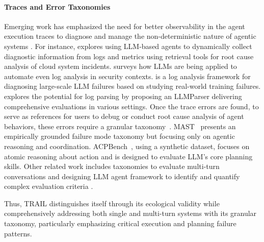\paragraph{Traces and Error Taxonomies} Emerging work has emphasized the need for better observability in the agent execution traces to diagnose and manage the non-deterministic nature of agentic systems \cite{kapoor2024ai, zhuge2024agent, moshkovich2025beyond, cemri2025multi}. 
For instance, \citet{roy2024exploring} explores using LLM-based agents to dynamically collect diagnostic information from logs and metrics using retrieval tools for root cause analysis of cloud system incidents. \citet{akhtar2025llm} surveys how LLMs are being applied to automate even log analysis in security contexts. \citet{jiang2025l4} is a log analysis framework for diagnosing large-scale LLM failures based on studying real-world training failures. \citet{Ma2024LLMParserAE} explores the potential for log parsing by proposing an LLMParser delivering comprehensive evaluations in various settings.
Once the trace errors are found, to serve as references for users to debug or conduct root cause analysis of agent behaviors, these errors require a granular taxonomy~\cite{cemri2025multi,kokel2025acp, bai-etal-2024-mt}. MAST~\cite{cemri2025multi} presents an empirically grounded failure mode taxonomy but focusing only on agentic reasoning and coordination. ACPBench~\cite{kokel2025acp}, using a synthetic dataset, focuses on atomic reasoning about action and is designed to evaluate LLM's core planning skills. Other related work includes taxonomies to evaluate multi-turn conversations \cite{bai-etal-2024-mt} and designing LLM agent framework to identify and quantify complex evaluation criteria \cite{arabzadeh-etal-2024-assessing, epperson2025interactive}.

Thus, \textsc{TRAIL} distinguishes itself through its ecological validity while comprehensively addressing both single and multi-turn systems with its granular taxonomy, particularly emphasizing critical execution and planning failure patterns.
